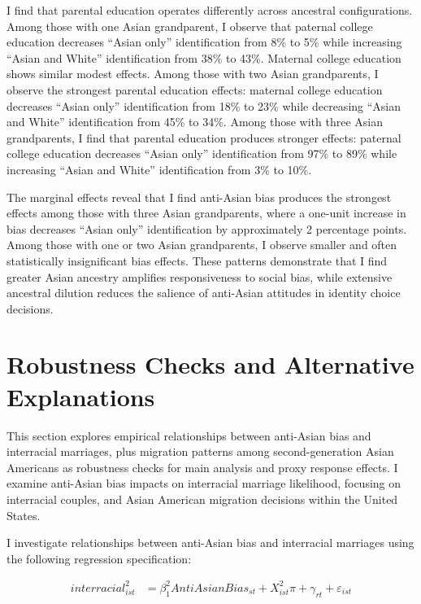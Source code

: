 I find that parental education operates differently across ancestral configurations. Among those with one Asian grandparent, I observe that paternal college education decreases ``Asian only'' identification from 8\% to 5\% while increasing ``Asian and White'' identification from 38\% to 43\%. Maternal college education shows similar modest effects. Among those with two Asian grandparents, I observe the strongest parental education effects: maternal college education decreases ``Asian only'' identification from 18\% to 23\% while decreasing ``Asian and White'' identification from 45\% to 34\%. Among those with three Asian grandparents, I find that parental education produces stronger effects: paternal college education decreases ``Asian only'' identification from 97\% to 89\% while increasing ``Asian and White'' identification from 3\% to 10\%.

The marginal effects reveal that I find anti-Asian bias produces the strongest effects among those with three Asian grandparents, where a one-unit increase in bias decreases ``Asian only'' identification by approximately 2 percentage points. Among those with one or two Asian grandparents, I observe smaller and often statistically insignificant bias effects. These patterns demonstrate that I find greater Asian ancestry amplifies responsiveness to social bias, while extensive ancestral dilution reduces the salience of anti-Asian attitudes in identity choice decisions.

\section{Robustness Checks and Alternative Explanations}\label{sec:robcheck}

This section explores empirical relationships between anti-Asian bias and interracial marriages, plus migration patterns among second-generation Asian Americans as robustness checks for main analysis and proxy response effects. I examine anti-Asian bias impacts on interracial marriage likelihood, focusing on interracial couples, and Asian American migration decisions within the United States.

I investigate relationships between anti-Asian bias and interracial marriages using the following regression specification:

\begin{align}
interracial_{ist}^2 &= \beta_1^2 AntiAsianBias_{st} + X_{ist}^2\pi + \gamma_{rt} 
            + \varepsilon_{ist}  \label{eq:inter-interracial} 
\end{align}

